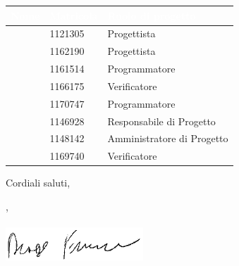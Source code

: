 \documentclass[12pt]{letter}
\begin{document}
\begin{letter}
        {
            \renewcommand{\arraystretch}{1.5}
            \begin{longtable}{ C{4cm} C{3cm} C{6cm} }
                \textcolor{white}{\textbf{Nome}} & \textcolor{white}{\textbf{Matricola}} & \textcolor{white}{\textbf{Ruolo di progetto}}\\
                \endhead 
                \MC{} & 1121305 & Progettista \\
                \LD{} & 1162190 & Progettista \\
                \CE{} & 1161514 & Programmatore \\
                \SE{} & 1166175 & Verificatore \\
                \PF{} & 1170747 & Programmatore \\
                \DF{} & 1146928 & Responsabile di Progetto \\
                \BR{} & 1148142 & Amministratore di Progetto \\
                \AT{} & 1169740 & Verificatore \\  
            \end{longtable}
        }
        Cordiali saluti,
        \closing{\DF{}, \\ \textit{\Responsabile{}}\\ \includegraphics[width=.6\linewidth]{../DocumentazioneEsterna/PianoDiProgetto/Sezioni/Immagini/Firme/Francesco.png}}
        \vspace{10mm}
    \end{letter}
\end{document}
